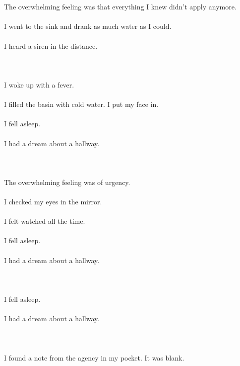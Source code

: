 \documentclass{article}
\begin{document}
    \section{}
    The overwhelming feeling was that everything I knew didn't apply anymore.\\\\I went to the sink and drank as much water as I could.\\\\I heard a siren in the distance.\\\\ 
    \newpage
    
    \section{}
    I woke up with a fever.\\\\I filled the basin with cold water. I put my face in.\\\\I fell asleep.\\\\I had a dream about a hallway.\\\\ 
    \newpage
    
    \section{}
    The overwhelming feeling was of urgency.\\\\I checked my eyes in the mirror.\\\\I felt watched all the time.\\\\I fell asleep.\\\\I had a dream about a hallway.\\\\ 
    \newpage
    
    \section{}
    I fell asleep.\\\\I had a dream about a hallway.\\\\ 
    \newpage
    
    \section{}
    I found a note from the agency in my pocket. It was blank.  
    \newpage
    
\end{document}
